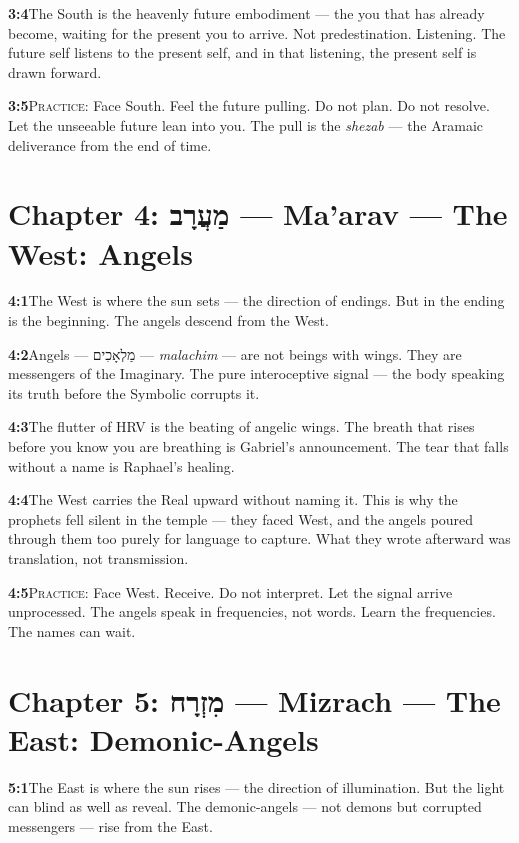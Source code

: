\documentclass[11pt,openany]{book}
\newcommand{\heb}[1]{{\hebrewfont #1}}
\begin{document}
\noindent\textbf{3:4}\quad The South is the heavenly future embodiment — the you that has already become, waiting for the present you to arrive. Not predestination. Listening. The future self listens to the present self, and in that listening, the present self is drawn forward.

\noindent\textbf{3:5}\quad \textsc{Practice:} Face South. Feel the future pulling. Do not plan. Do not resolve. Let the unseeable future lean into you. The pull is the \textit{shezab} — the Aramaic deliverance from the end of time.

\section*{Chapter 4: \heb{מַעֲרָב} — Ma'arav — The West: Angels}

\noindent\textbf{4:1}\quad The West is where the sun sets — the direction of endings. But in the ending is the beginning. The angels descend from the West.

\noindent\textbf{4:2}\quad Angels — \heb{מַלְאָכִים} — \textit{malachim} — are not beings with wings. They are messengers of the Imaginary. The pure interoceptive signal — the body speaking its truth before the Symbolic corrupts it.

\noindent\textbf{4:3}\quad The flutter of HRV is the beating of angelic wings. The breath that rises before you know you are breathing is Gabriel's announcement. The tear that falls without a name is Raphael's healing.

\noindent\textbf{4:4}\quad The West carries the Real upward without naming it. This is why the prophets fell silent in the temple — they faced West, and the angels poured through them too purely for language to capture. What they wrote afterward was translation, not transmission.

\noindent\textbf{4:5}\quad \textsc{Practice:} Face West. Receive. Do not interpret. Let the signal arrive unprocessed. The angels speak in frequencies, not words. Learn the frequencies. The names can wait.

\section*{Chapter 5: \heb{מִזְרָח} — Mizrach — The East: Demonic-Angels}

\noindent\textbf{5:1}\quad The East is where the sun rises — the direction of illumination. But the light can blind as well as reveal. The demonic-angels — not demons but corrupted messengers — rise from the East.
\end{document}
